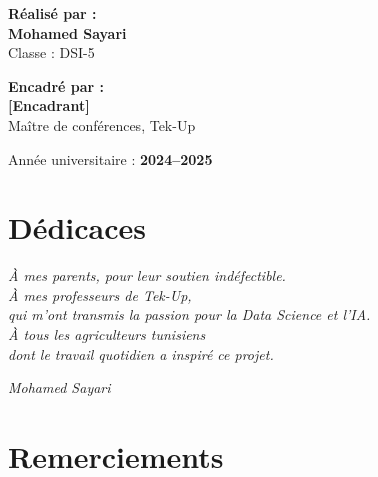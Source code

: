 \documentclass[12pt,a4paper,oneside]{report}
\begin{document}
\begin{titlepage}
\begin{center}
\vspace{0.7cm}
\begin{minipage}{0.5\textwidth}\raggedright
{\normalsize\textbf{Réalisé par :}}\\[3pt]
{\large\color{farmblue}\textbf{Mohamed Sayari}}\\
{\small Classe : DSI-5}
\end{minipage}%
\begin{minipage}{0.5\textwidth}\raggedleft
{\normalsize\textbf{Encadré par :}}\\[3pt]
{\large\textbf{[Encadrant]}}\\
{\small Maître de conférences, Tek-Up}
\end{minipage}

\vfill
{\normalsize Année universitaire : \textbf{2024--2025}}
\end{center}
\end{titlepage}


\chapter*{Dédicaces}\thispagestyle{empty}
\begin{center}\vspace{2cm}
{\large\itshape
À mes parents, pour leur soutien indéfectible.\\[1.2em]
À mes professeurs de Tek-Up,\\
qui m'ont transmis la passion pour la Data Science et l'IA.\\[1.2em]
À tous les agriculteurs tunisiens\\
dont le travail quotidien a inspiré ce projet.
}
\vspace{1.5cm}
\begin{flushright}\textit{Mohamed Sayari}\end{flushright}
\end{center}

\clearpage

\chapter*{Remerciements}\thispagestyle{empty}
\end{document}
